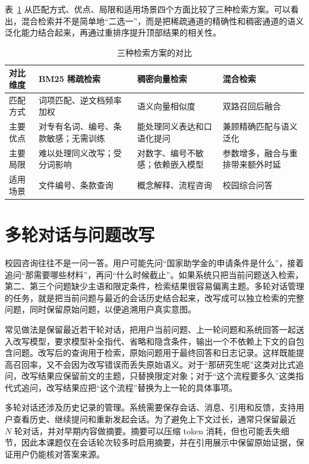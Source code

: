 表~\ref{tab:retrieval-compare} 从匹配方式、优点、局限和适用场景四个方面比较了三种检索方案。可以看出，混合检索并不是简单地“二选一”，而是把稀疏通道的精确性和稠密通道的语义泛化能力结合起来，再通过重排序提升顶部结果的相关性。

\begin{table}[H]
  \centering
  \caption{三种检索方案的对比}
  \label{tab:retrieval-compare}
  \renewcommand{\arraystretch}{1.25}
  \begin{tabular}{p{2.2cm}p{3.4cm}p{3.6cm}p{3.6cm}}
    \toprule
    对比维度 & BM25 稀疏检索 & 稠密向量检索 & 混合检索 \\
    \midrule
    匹配方式 & 词项匹配、逆文档频率加权 & 语义向量相似度 & 双路召回后融合 \\
    主要优点 & 对专有名词、编号、条款敏感；无需训练 & 能处理同义表达和口语化提问 & 兼顾精确匹配与语义泛化 \\
    主要局限 & 难以处理同义改写；受分词影响 & 对数字、编号不敏感；依赖嵌入模型 & 参数增多，融合与重排带来额外时延 \\
    适用场景 & 文件编号、条款查询 & 概念解释、流程咨询 & 校园综合问答 \\
    \bottomrule
  \end{tabular}
\end{table}

\section{多轮对话与问题改写}
\label{sec:multi-turn}

校园咨询往往不是一问一答。用户可能先问“国家助学金的申请条件是什么”，接着追问“那需要哪些材料”，再问“什么时候截止”。如果系统只把当前问题送入检索，第二、第三个问题缺少主语和限定条件，检索结果很容易偏离主题。多轮对话管理的任务，就是把当前问题与最近的会话历史结合起来，改写成可以独立检索的完整问题，同时保留原始问题，以便追溯用户真实意图。

常见做法是保留最近若干轮对话，把用户当前问题、上一轮问题和系统回答一起送入改写模型，要求模型补全指代、省略和隐含条件，输出一个不依赖上下文的自包含问题。改写后的查询用于检索，原始问题用于最终回答和日志记录。这样既能提高召回率，又不会因为改写错误而丢失原始语义。对于“那研究生呢”这类对比式追问，改写结果应保留前文的主题，只替换限定对象；对于“这个流程要多久”这类指代式追问，改写结果应把“这个流程”替换为上一轮的具体事项。

多轮对话还涉及历史记录的管理。系统需要保存会话、消息、引用和反馈，支持用户查看历史、继续提问和重新发起会话。为了避免上下文过长，通常只保留最近 $N$ 轮对话，并对早期内容做摘要。摘要可以压缩 token 消耗，但也可能丢失细节，因此本课题仅在会话轮次较多时启用摘要，并在引用展示中保留原始证据，保证用户仍能核对答案来源。

